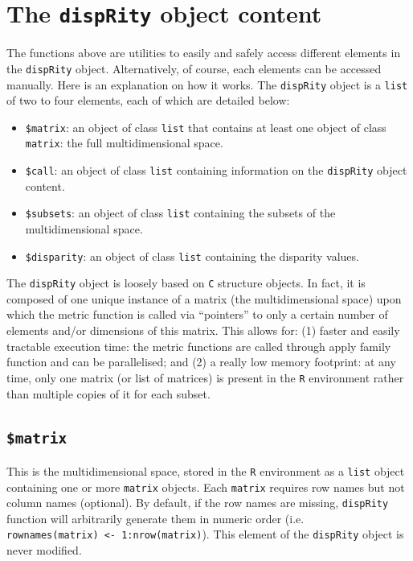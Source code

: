 \documentclass[]{book}
\providecommand{\tightlist}{%
  \setlength{\itemsep}{0pt}\setlength{\parskip}{0pt}}
\begin{document}
\hypertarget{disprity-object}{%
\section{\texorpdfstring{The \texttt{dispRity} object content}{The dispRity object content}}\label{disprity-object}}

The functions above are utilities to easily and safely access different elements in the \texttt{dispRity} object.
Alternatively, of course, each elements can be accessed manually.
Here is an explanation on how it works.
The \texttt{dispRity} object is a \texttt{list} of two to four elements, each of which are detailed below:

\begin{itemize}
\tightlist
\item
  \texttt{\$matrix}: an object of class \texttt{list} that contains at least one object of class \texttt{matrix}: the full multidimensional space.
\item
  \texttt{\$call}: an object of class \texttt{list} containing information on the \texttt{dispRity} object content.
\item
  \texttt{\$subsets}: an object of class \texttt{list} containing the subsets of the multidimensional space.
\item
  \texttt{\$disparity}: an object of class \texttt{list} containing the disparity values.
\end{itemize}

The \texttt{dispRity} object is loosely based on \texttt{C} structure objects.
In fact, it is composed of one unique instance of a matrix (the multidimensional space) upon which the metric function is called via ``pointers'' to only a certain number of elements and/or dimensions of this matrix.
This allows for: (1) faster and easily tractable execution time: the metric functions are called through apply family function and can be parallelised; and (2) a really low memory footprint: at any time, only one matrix (or list of matrices) is present in the \texttt{R} environment rather than multiple copies of it for each subset.

\hypertarget{matrix}{%
\subsection{\texorpdfstring{\texttt{\$matrix}}{\$matrix}}\label{matrix}}

This is the multidimensional space, stored in the \texttt{R} environment as a \texttt{list} object containing one or more \texttt{matrix} objects.
Each \texttt{matrix} requires row names but not column names (optional).
By default, if the row names are missing, \texttt{dispRity} function will arbitrarily generate them in numeric order (i.e. \texttt{rownames(matrix)\ \textless{}-\ 1:nrow(matrix)}).
This element of the \texttt{dispRity} object is never modified.
\end{document}
